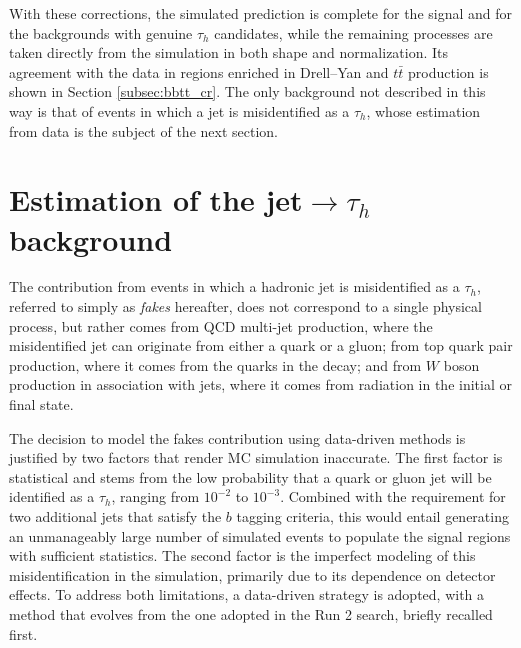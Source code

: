 With these corrections, the simulated prediction is complete for the signal and for the backgrounds with genuine $\tau_h$ candidates, while the remaining processes are taken directly from the simulation in both shape and normalization. Its agreement with the data in regions enriched in Drell--Yan and $t\bar{t}$ production is shown in Section \ref{subsec:bbtt_cr}. The only background not described in this way is that of events in which a jet is misidentified as a $\tau_h$, whose estimation from data is the subject of the next section.








\section{Estimation of the jet\texorpdfstring{$\to\tau_h$}{ -> tau h} background}
\label{sec:bbtt_ff}
%
The contribution from events in which a hadronic jet is misidentified as a $\tau_h$, referred to simply as \textit{fakes} hereafter, does not correspond to a single physical process, but rather comes from QCD multi-jet production, where the misidentified jet can originate from either a quark or a gluon; from top quark pair production, where it comes from the quarks in the decay; and from $W$ boson production in association with jets, where it comes from radiation in the initial or final state. 

The decision to model the fakes contribution using data-driven methods is justified by two factors that render MC simulation inaccurate. The first factor is statistical and stems from the low probability that a quark or gluon jet will be identified as a $\tau_h$, ranging from $10^{-2}$ to $10^{-3}$. Combined with the requirement for two additional jets that satisfy the $b$ tagging criteria, this would entail generating an unmanageably large number of simulated events to populate the signal regions with sufficient statistics. The second factor is the imperfect modeling of this misidentification in the simulation, primarily due to its dependence on detector effects. To address both limitations, a data-driven strategy is adopted, with a method that evolves from the one adopted in the Run 2 search, briefly recalled first.


